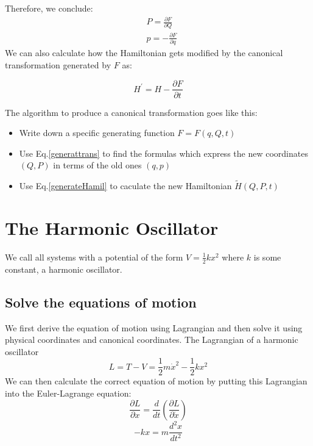 Therefore, we conclude:
$$
\begin{aligned}
&P=\frac{\partial F}{\partial Q}\\
&p=-\frac{\partial F}{\partial q}
\end{aligned}
$$
We can also calculate how the Hamiltonian gets modified by the canonical transformation generated by $F$ as:
\begin{qt}
    \begin{equation}
        H^{\prime}=H-\frac{\partial F}{\partial t}
        \label{generateHamil}
    \end{equation}
\end{qt}

The algorithm to produce a canonical transformation goes like this:
\begin{qt}
    \begin{itemize}
    \item Write down a specific generating function $F=F(q, Q, t)$
    \item Use Eq.\ref{generattrans} to find the formulas which express the new coordinates $(Q, P)$ in terms of the old ones $(q, p)$
    \item Use Eq.\ref{generateHamil} to caculate the new Hamiltonian $\tilde{H}(Q,P,t)$
\end{itemize}
\end{qt}

\section{The Harmonic Oscillator}
We call all systems with a potential of the form $V=\frac{1}{2}k x^{2}$ where $k$ is some constant, a harmonic oscillator.
\subsection{Solve the
equations of motion}
We first derive the equation of motion using Lagrangian and then solve it using physical coordinates and canonical coordinates. The Lagrangian of a harmonic oscillator
\begin{equation}
L=T-V=\frac{1}{2} m \dot{x}^{2}-\frac{1}{2} k x^{2}
\end{equation}
We can then calculate the correct equation of motion by putting this Lagrangian into the Euler-Lagrange equation:
$$
\frac{\partial L}{\partial x}=\frac{d}{d t}\left(\frac{\partial L}{\partial \dot{x}}\right)
$$
\begin{equation}
    -k x=m \frac{d^{2} x}{d t^{2}}
    \label{harmoEM}
\end{equation}

